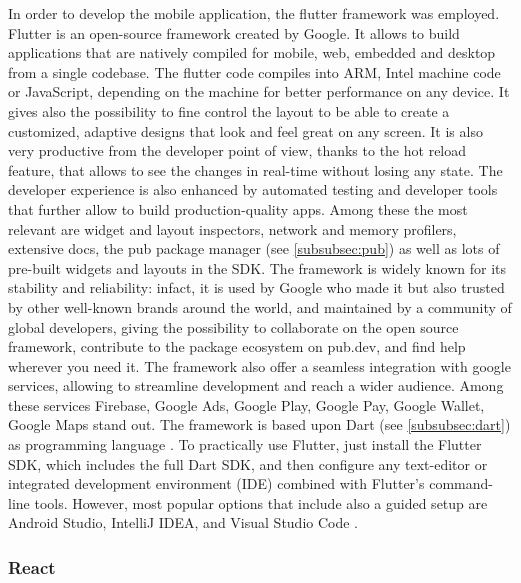 In order to develop the mobile application, the flutter framework was employed. Flutter is an open-source framework created by Google. It allows to build applications that are natively compiled for mobile, web, embedded and desktop from a single codebase. The flutter code compiles into ARM, Intel machine code or JavaScript, depending on the machine for better performance on any device. It gives also the possibility to fine control the layout to be able to create a customized, adaptive designs that look and feel great on any screen. It is also very productive from the developer point of view, thanks to the hot reload feature, that allows to see the changes in real-time without losing any state. The developer experience is also enhanced by automated testing and developer tools that further allow to build production-quality apps. Among these the most relevant are widget and layout inspectors, network and memory profilers, extensive docs, the pub package manager (see \cref{subsubsec:pub}) as well as lots of pre-built widgets and layouts in the SDK. The framework is widely known for its stability and reliability: infact, it is used by Google who made it but also trusted by other well-known brands around the world, and maintained by a community of global developers, giving the possibility to collaborate on the open source framework, contribute to the package ecosystem on pub.dev, and find help wherever you need it. The framework also offer a seamless integration with google services, allowing to streamline development and reach a wider audience. Among these services Firebase, Google Ads, Google Play, Google Pay, Google Wallet, Google Maps stand out. The framework is based upon Dart (see \cref{subsubsec:dart}) as programming language \cite{Flutter}. To practically use Flutter, just install the Flutter SDK, which includes the full Dart SDK, and then configure any text-editor or integrated development environment (IDE) combined with Flutter's command-line tools. However, most popular options that include also a guided setup are Android Studio, IntelliJ IDEA, and Visual Studio Code \cite{FlutterGetStarted}.

\newpage

\subsubsection{React}

